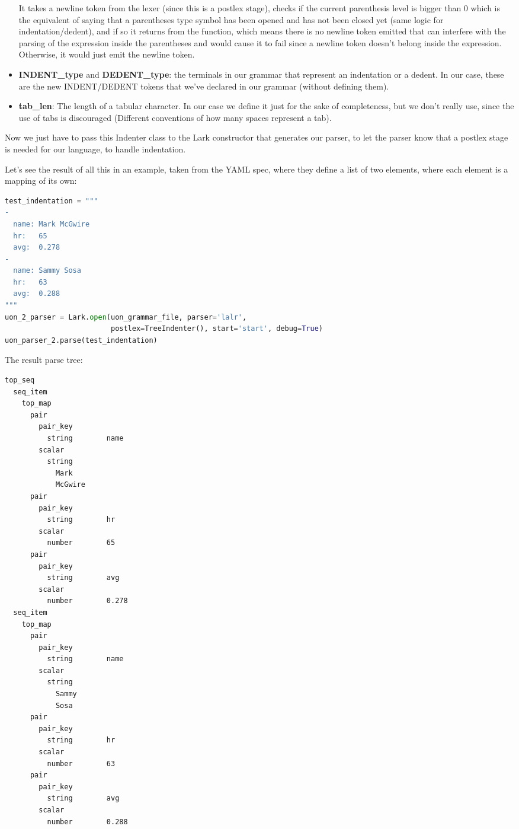 \documentclass[12pt]{article}
\begin{document}
\begin{itemize}
    It takes a newline token from the lexer (since this is a postlex stage), checks if the current parenthesis level is bigger than 0 which is the equivalent of saying that a parentheses type symbol has been opened and has not been closed yet (same logic for indentation/dedent), and if so it returns from the function, which means there is no newline token emitted that can interfere with the parsing of the expression inside the parentheses and would cause it to fail since a newline token doesn't belong inside the expression. Otherwise, it would just emit the newline token.

    \item \textbf{INDENT\_type} and \textbf{DEDENT\_type}: the terminals in our grammar that represent an indentation or a dedent. In our case, these are the new INDENT/DEDENT tokens that we've declared in our grammar (without defining them).
    \item \textbf{tab\_len}: The length of a tabular character. In our case we define it just for the sake of completeness, but we don't really use, since the use of tabs is discouraged (Different conventions of how many spaces represent a tab).
\end{itemize}

Now we just have to pass this Indenter class to the Lark constructor that generates our parser, to let the parser know that a postlex stage is needed for our language, to handle indentation.

Let's see the result of all this in an example, taken from the YAML spec, where they define a list of two elements, where each element is a mapping of its own:
\begin{lstlisting}[language=Python]
test_indentation = """
-
  name: Mark McGwire
  hr:   65
  avg:  0.278
-
  name: Sammy Sosa
  hr:   63
  avg:  0.288
"""
uon_2_parser = Lark.open(uon_grammar_file, parser='lalr',
                         postlex=TreeIndenter(), start='start', debug=True)
uon_parser_2.parse(test_indentation)
\end{lstlisting}

The result parse tree:

\begin{lstlisting}
top_seq
  seq_item
    top_map
      pair
        pair_key
          string        name
        scalar
          string
            Mark
            McGwire
      pair
        pair_key
          string        hr
        scalar
          number        65
      pair
        pair_key
          string        avg
        scalar
          number        0.278
  seq_item
    top_map
      pair
        pair_key
          string        name
        scalar
          string
            Sammy
            Sosa
      pair
        pair_key
          string        hr
        scalar
          number        63
      pair
        pair_key
          string        avg
        scalar
          number        0.288
\end{lstlisting}
\end{document}
